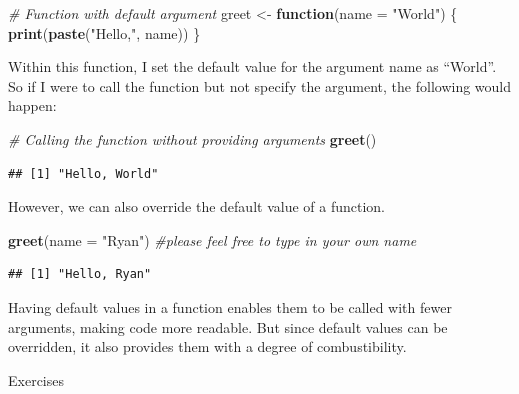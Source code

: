 \documentclass[
]{book}
\newenvironment{Shaded}{\begin{snugshade}}{\end{snugshade}}
\newcommand{\AttributeTok}[1]{\textcolor[rgb]{0.13,0.29,0.53}{#1}}
\newcommand{\CommentTok}[1]{\textcolor[rgb]{0.56,0.35,0.01}{\textit{#1}}}
\newcommand{\ControlFlowTok}[1]{\textcolor[rgb]{0.13,0.29,0.53}{\textbf{#1}}}
\newcommand{\FunctionTok}[1]{\textcolor[rgb]{0.13,0.29,0.53}{\textbf{#1}}}
\newcommand{\NormalTok}[1]{#1}
\newcommand{\OtherTok}[1]{\textcolor[rgb]{0.56,0.35,0.01}{#1}}
\newcommand{\StringTok}[1]{\textcolor[rgb]{0.31,0.60,0.02}{#1}}
\begin{document}
\begin{Shaded}
\begin{Highlighting}[]
\CommentTok{\# Function with default argument}
\NormalTok{greet }\OtherTok{\textless{}{-}} \ControlFlowTok{function}\NormalTok{(}\AttributeTok{name =} \StringTok{"World"}\NormalTok{) \{}
  \FunctionTok{print}\NormalTok{(}\FunctionTok{paste}\NormalTok{(}\StringTok{"Hello,"}\NormalTok{, name))}
\NormalTok{\}}
\end{Highlighting}
\end{Shaded}

Within this function, I set the default value for the argument name as ``World''. So if I were to call the function but not specify the argument, the following would happen:

\begin{Shaded}
\begin{Highlighting}[]
\CommentTok{\# Calling the function without providing arguments}
\FunctionTok{greet}\NormalTok{() }
\end{Highlighting}
\end{Shaded}

\begin{verbatim}
## [1] "Hello, World"
\end{verbatim}

However, we can also override the default value of a function.

\begin{Shaded}
\begin{Highlighting}[]
\FunctionTok{greet}\NormalTok{(}\AttributeTok{name =} \StringTok{"Ryan"}\NormalTok{) }\CommentTok{\#please feel free to type in your own name}
\end{Highlighting}
\end{Shaded}

\begin{verbatim}
## [1] "Hello, Ryan"
\end{verbatim}

Having default values in a function enables them to be called with fewer arguments, making code more readable. But since default values can be overridden, it also provides them with a degree of combustibility.

Exercises
\end{document}
